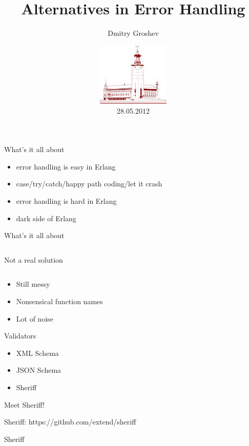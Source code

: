 \documentclass[10pt]{beamer}
\title[Об ошибках]{Alternatives in Error Handling}
\author{Dmitry Groshev}
\date{\includegraphics[height=3cm]{stadshuset-townhall2}\\28.05.2012}
\institute{Erlang User Conference 2012}
\newcommand{\code}[4]{\inputminted[linenos, frame=none, firstline=#2, lastline=#3,
  framesep=10pt, bgcolor=lightgray]{#4}{#1}}
\begin{document}
\renewcommand*{\inserttotalframenumber}{\pageref{lastframe}}
\begin{frame}
\titlepage
\end{frame}

\begin{frame}{What's it all about}
  \begin{itemize}
  \item error handling is easy in Erlang
  \item case/try/catch/happy path coding/let it crash
  \item error handling is hard in Erlang
  \item dark side of Erlang
  \end{itemize}
\end{frame}

\begin{frame}{What's it all about}
  \begin{center}
    \code{code.erl}{1}{17}{erlang}
  \end{center}
\end{frame}

\begin{frame}{Not a real solution}
  \code{code.erl}{19}{29}{erlang}
  \begin{itemize}
  \item Still messy
  \item Nonsensical function names
  \item Lot of noise
  \end{itemize}
\end{frame}

\begin{frame}{Validators}
  \begin{itemize}
  \item XML Schema
  \item JSON Schema
  \item Sheriff
  \end{itemize}
\end{frame}

\begin{frame}{Meet Sheriff!}
  \begin{center}
    \Large
    Sheriff: https://github.com/extend/sheriff
  \end{center}
\end{frame}

\begin{frame}{Sheriff}
  \code{code.erl}{31}{37}{erlang}
\end{frame}
\end{document}
